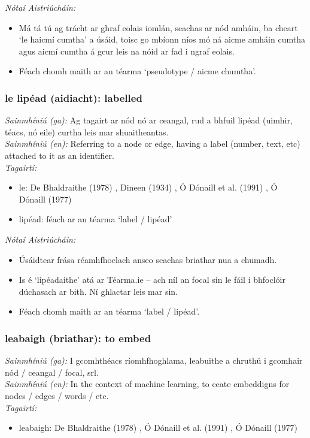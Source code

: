  \noindent \textit{Nótaí Aistriúcháin:}
\begin{itemize}
	\item Má tá tú ag trácht ar ghraf eolais iomlán, seachas ar nód amháin, ba cheart `le haicmí cumtha' a úsáid, toisc go mbíonn níos mó ná aicme amháin cumtha agus aicmí cumtha á gcur leis na nóid ar fad i ngraf eolais.
	\item Féach chomh maith ar an téarma `pseudotype / aicme chumtha'.
\end{itemize}


\subsubsection*{le lipéad (aidiacht): labelled}
 \noindent \textit{Sainmhíniú (ga):} Ag tagairt ar nód nó ar ceangal, rud a bhfuil lipéad (uimhir, téacs, nó eile) curtha leis mar shuaitheantas.
\\
 \noindent \textit{Sainmhíniú (en):} Referring to a node or edge, having a label (number, text, etc) attached to it as an identifier.
\\
 \noindent \textit{Tagairtí:}
\begin{itemize}
	\item le: De Bhaldraithe (1978) \cite{de-bhaldraithe}, Dineen (1934) \cite{dineen}, Ó Dónaill et al. (1991) \cite{focloir-beag}, Ó Dónaill (1977) \cite{odonaill}
	\item lipéad: féach ar an téarma `label / lipéad'
\end{itemize}

 \noindent \textit{Nótaí Aistriúcháin:}
\begin{itemize}
	\item Úsáidtear frása réamhfhoclach anseo seachas briathar nua a chumadh.
	\item Is é `lipéadaithe' atá ar Téarma.ie -- ach níl an focal sin le fáil i bhfoclóir dúchasach ar bith. Ní ghlactar leis mar sin.
	\item Féach chomh maith ar an téarma `label / lipéad'.
\end{itemize}


\subsubsection*{leabaigh (briathar): to embed}
 \noindent \textit{Sainmhíniú (ga):} I gcomhthéacs ríomhfhoghlama, leabuithe a chruthú i gcomhair nód / ceangal / focal, srl.
\\
 \noindent \textit{Sainmhíniú (en):} In the context of machine learning, to ceate embeddigns for nodes / edges / words / etc.
\\
 \noindent \textit{Tagairtí:}
\begin{itemize}
	\item leabaigh: De Bhaldraithe (1978) \cite{de-bhaldraithe}, Ó Dónaill et al. (1991) \cite{focloir-beag}, Ó Dónaill (1977) \cite{odonaill}
\end{itemize}

